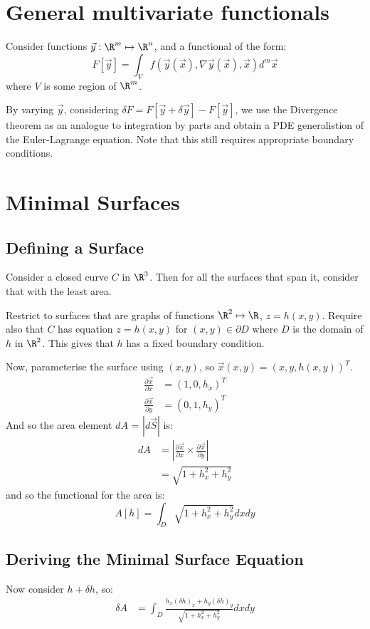 \documentclass[../Main.tex]{subfiles}
\begin{document}
\section{General multivariate functionals}
Consider functions $\vec{y} : \R^m \mapsto \R^n$, and a functional of the form:
\begin{equation*}
    F[\vec{y}] = \int_V f(\vec{y}(\vec{x}), \nabla \vec{y} (\vec{x}), \vec{x})d^m \vec{x}
\end{equation*}
where $V$ is some region of $\R^m$.

By varying $\vec{y}$, considering $\delta F = F[\vec{y} + \delta \vec{y}] - F[\vec{y}]$, we use the Divergence theorem as an analogue to integration by parts and obtain a PDE generalistion of the Euler-Lagrange equation. Note that this still requires appropriate boundary conditions.
\section{Minimal Surfaces}
\subsection{Defining a Surface}
Consider a closed curve $C$ in $\R^3$. Then for all the surfaces that span it, consider that with the least area.

Restrict to surfaces that are graphs of functions $\R^2 \mapsto \R$, $z = h(x, y)$. Require also that $C$ has equation $z = h(x, y)$ for $(x, y) \in \partial D$ where $D$ is the domain of $h$ in $\R^2$. This gives that $h$ has a fixed boundary condition.

Now, parameterise the surface using $(x, y)$, so $\vec{x}(x, y) = (x, y, h(x, y))^T$.
\begin{align*}
    \frac{\partial \vec{x}}{\partial x} &= (1, 0, h_x)^T \\
    \frac{\partial \vec{x}}{\partial y} &= (0, 1, h_y)^T
\end{align*}
And so the area element $dA$ = $|d\vec{S}|$ is:
\begin{align*}
    dA &= \left|\frac{\partial \vec{x}}{\partial x} \times \frac{\partial \vec{x}}{\partial y} \right| \\
    &= \sqrt{1 + h_x^2 + h_y^2}
\end{align*}
and so the functional for the area is:
\begin{equation*}
    A[h] = \int_D \sqrt{1 + h_x^2 + h_y^2} dx dy
\end{equation*}
\subsection{Deriving the Minimal Surface Equation}
Now consider $h + \delta h$, so:
\begin{align*}
    \delta A &= \int_D \frac{h_x (\delta h)_x + h_y (\delta h)_y}{\sqrt{1 + h_x^2 + h_y^2}} dx dy
\end{align*}
\end{document}
